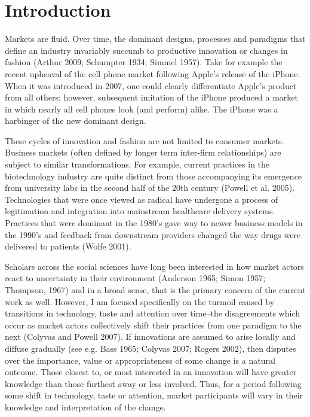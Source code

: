 \chapter{Introduction\label{intro}}

Markets are fluid. Over time, the dominant designs, processes and paradigms that define an industry invariably succumb to productive innovation or changes in fashion (Arthur 2009; Schumpter 1934; Simmel 1957). Take for example the recent upheaval of the cell phone market following Apple's release of the iPhone. When it was introduced in 2007, one could clearly differentiate Apple's product from all others; however, subsequent imitation of the iPhone produced a market in which nearly all cell phones look (and perform) alike. The iPhone was a harbinger of the new dominant design.

These cycles of innovation and fashion are not limited to consumer markets. Business markets (often defined by longer term inter-firm relationships) are subject to similar transformations. For example, current practices in the biotechnology industry are quite distinct from those accompanying its emergence from university labs in the second half of the 20th century (Powell et al. 2005). Technologies that were once viewed as radical have undergone a process of legitimation and integration into mainstream healthcare delivery systems. Practices that were dominant in the 1980's gave way to newer business models in the 1990's and feedback from downstream providers changed the way drugs were delivered to patients (Wolfe 2001). 

Scholars across the social sciences have long been interested in how market actors react to uncertainty in their environment (Anderson 1965; Simon 1957; Thompson, 1967) and in a broad sense, that is the primary concern of the current work as well. However, I am focused specifically on the turmoil caused by transitions in technology, taste and attention over time--the disagreements which occur as market actors collectively shift their practices from one paradigm to the next (Colyvas and Powell 2007). If innovations are assumed to arise locally and diffuse gradually (see e.g. Bass 1965; Colyvas 2007; Rogers 2002), then disputes over the importance, value or appropriateness of some change is a natural outcome. Those closest to, or most interested in an innovation will have greater knowledge than those furthest away or less involved. Thus, for a period following some shift in technology, taste or attention, market participants will vary in their knowledge and interpretation of the change.

